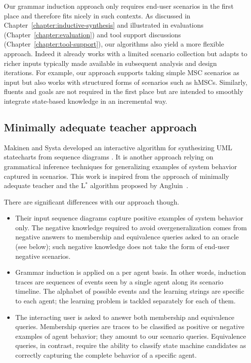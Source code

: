 Our grammar induction approach only requires end-user scenarios in the first place and therefore fits nicely in such contexts. As discussed in Chapter~\ref{chapter:inductive-synthesis} and illustrated in evaluations (Chapter~\ref{chapter:evaluation}) and tool support discussions (Chapter~\ref{chapter:tool-support}), our algorithms also yield a more flexible approach. Indeed it already works with a limited scenario collection but adapts to richer inputs typically made available in subsequent analysis and design iterations. For example, our approach supports taking simple MSC scenarios as input but also works with structured forms of scenarios such as hMSCs. Similarly, fluents and goals are not required in the first place but are intended to smoothly integrate state-based knowledge in an incremental way.


\subsection{Minimally adequate teacher approach}

Makinen and Systa developed an interactive algorithm for synthesizing UML statecharts from sequence diagrams \cite{Makinen:2001}. It is another approach relying on grammatical inference techniques for generalizing examples of system behavior captured in scenarios. This work is inspired from the approach of minimally adequate teacher and the L$^*$ algorithm proposed by Angluin~\cite{Angluin:1987}. 

There are significant differences with our approach though.
\begin{itemize}

\item Their input sequence diagrams capture positive examples of system behavior only. The negative knowledge required to avoid overgeneralization comes from negative answers to membership and equivalence queries asked to an oracle (see below); such negative knowledge does not take the form of end-user negative scenarios.

\item Grammar induction is applied on a per agent basis. In other words, induction traces are sequences of events seen by a single agent along its scenario timeline. The alphabet of possible events and the learning strings are specific to each agent; the learning problem is tackled separately for each of them.

\item The interacting user is asked to answer both membership and equivalence queries. Membership queries are traces to be classified as positive or negative examples of agent behavior; they amount to our scenario queries. Equivalence queries, in contrast, require the ability to classify state machine candidates as correctly capturing the complete behavior of a specific agent.
\end{itemize}

